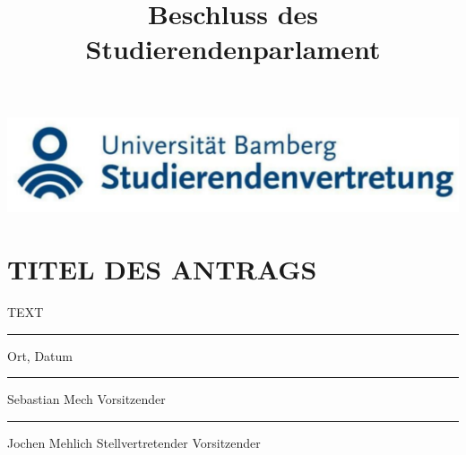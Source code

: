 \documentclass{article}
\title{Beschluss des Studierendenparlament}
\begin{document}
\begin{center}
    \includegraphics[width=\textwidth]{stuve-logo.png}
\end{center}

\section*{TITEL DES ANTRAGS}

\vspace{50px}

TEXT

\vspace{100px}


\parbox{5cm}{\hrule
\strut \centering\footnotesize Ort, Datum} 

\vspace{50px}

\parbox{5cm}{\hrule
\strut \centering\footnotesize Sebastian Mech \newline Vorsitzender} \hfill\parbox{5cm}{\hrule
\strut \centering\footnotesize Jochen Mehlich \newline Stellvertretender Vorsitzender}
\end{document}

